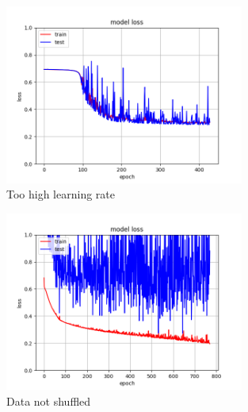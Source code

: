 \begin{figure}[H]
\center
\includegraphics[width=0.7\textwidth]{pictures/high_lr.png}
\caption{\label{fig:high_lr}Too high learning rate}
\end{figure}

\begin{figure}[H]
\center
\includegraphics[width=0.7\textwidth]{pictures/no_shuffle.png}
\caption{\label{fig:no_shuffle}Data not shuffled}
\end{figure}


